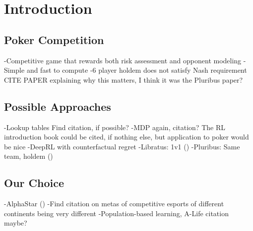 \chapter{Introduction}

\section{Poker Competition}
-Competitive game that rewards both risk assessment and opponent modeling
-Simple and fast to compute
-6 player holdem does not satisfy Nash requirement {CITE PAPER explaining why this matters, I think it was the Pluribus paper?}

\section{Possible Approaches}
-Lookup tables {Find citation, if possible?}
-MDP {again, citation? The RL introduction book could be cited, if nothing else, but application to poker would be nice}
-DeepRL with counterfactual regret
    -Libratus: 1v1 (\cite{Libratus})
    -Pluribus: Same team, holdem (\cite{Pluribus})

\section{Our Choice}
-AlphaStar (\cite{AlphaStar})
-{Find citation on metas of competitive esports of different continents being very different}
-Population-based learning, A-Life citation maybe?
